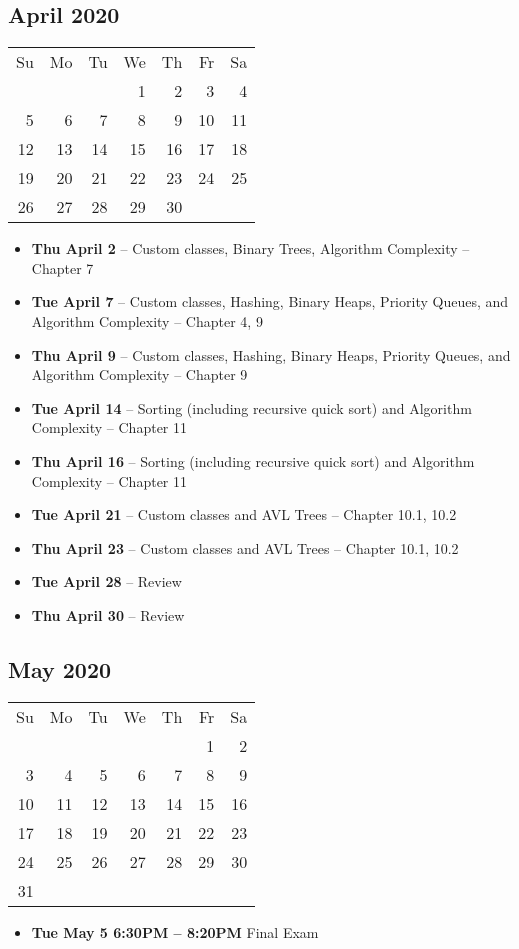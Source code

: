 \documentclass{article}
\begin{document}
\subsection*{April 2020}
\begin{tabular}{rrrrrrr}
Su & Mo & Tu & We & Th & Fr & Sa\\
   &    &    &  1 &  2 &  3 &  4\\
 5 &  6 &  7 &  8 &  9 & 10 & 11\\
12 & 13 & 14 & 15 & 16 & 17 & 18\\
19 & 20 & 21 & 22 & 23 & 24 & 25\\ 
26 & 27 & 28 & 29 & 30 &    &\\ 
\end{tabular}
\begin{itemize}
\item \textbf{Thu April  2} 
    -- Custom classes, Binary Trees, Algorithm Complexity
    -- Chapter 7
\item \textbf{Tue April  7 } 
    -- Custom classes, Hashing, Binary Heaps, Priority Queues, and
        Algorithm Complexity
    -- Chapter 4, 9
\item \textbf{Thu April  9} 
    -- Custom classes, Hashing, Binary Heaps, Priority Queues, and
        Algorithm Complexity
    -- Chapter 9
\item \textbf{Tue April 14} 
    -- Sorting (including recursive quick sort) and Algorithm
        Complexity
    -- Chapter 11
\item \textbf{Thu April 16} 
    -- Sorting (including recursive quick sort) and Algorithm Complexity
    -- Chapter 11
\item \textbf{Tue April 21} 
    -- Custom classes and AVL Trees
    -- Chapter 10.1, 10.2
\item \textbf{Thu April 23} 
    -- Custom classes and AVL Trees
    -- Chapter 10.1, 10.2
\item \textbf{Tue April 28} -- Review
\item \textbf{Thu April 30} -- Review
\end{itemize}

\subsection*{May 2020}
\begin{tabular}{rrrrrrr}
Su & Mo & Tu & We & Th & Fr & Sa  \\
   &    &    &    &    &  1 &  2  \\
 3 &  4 &  5 &  6 &  7 &  8 &  9  \\
10 & 11 & 12 & 13 & 14 & 15 & 16  \\
17 & 18 & 19 & 20 & 21 & 22 & 23  \\
24 & 25 & 26 & 27 & 28 & 29 & 30  \\
31 &    &    &    &    &    &     \\
\end{tabular}
\begin{itemize}
\item \textbf{Tue May 5 6:30PM -- 8:20PM} Final Exam
\end{itemize}
\end{document}
